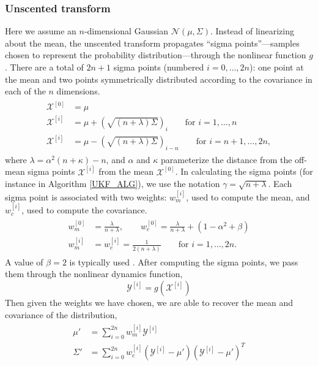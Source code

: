 \documentclass[twoside]{article}
\begin{document}
\subsubsection{Unscented transform}
Here we assume an $n$-dimensional Gaussian $\mathcal{N}(\mu,\Sigma)$. Instead of linearizing about the mean, the unscented transform propagates ``sigma points''---samples chosen to represent the probability distribution---through the nonlinear function $g$. There are a total of $2n+1$ sigma points (numbered $i = 0, \dots, 2n$): one point at the mean and two points symmetrically  distributed according to the covariance in each of the $n$ dimensions.
\begin{align}
\begin{split}
\mathcal{X}^{[0]} &= \mu \\
\mathcal{X}^{[i]} &= \mu + \left(\sqrt{(n+ \lambda)\Sigma}\right)_i \qquad \text{for $i = 1, \dots, n$} \\
\mathcal{X}^{[i]} &= \mu - \left(\sqrt{(n+ \lambda)\Sigma}\right)_{i-n} \qquad \text{for $i = n+1, \dots, 2n$},
\end{split}
\label{UKFsigpts}
\end{align}
where $\lambda = \alpha^2(n+\kappa) - n$, and $\alpha$ and $\kappa$ parameterize the distance from the off-mean sigma points $\mathcal{X}^{[i]}$ from the mean $\mathcal{X}^{[0]}$. In calculating the sigma points (for instance in Algorithm \ref{UKF_ALG}), we use the notation $\gamma = \sqrt{n + \lambda}$.
Each sigma point is associated with two weights: $w_m^{[i]}$, used to compute the mean, and $w_c^{[i]}$, used to compute the covariance.
\begin{align}
\begin{split}
w_m^{[0]} &= \frac{\lambda}{n + \lambda}, \qquad w_c^{[0]} = \frac{\lambda}{n + \lambda} + (1 - \alpha^2 + \beta) \\
w_m^{[i]} &= w_c^{[i]} = \frac{1}{2(n+\lambda)} \qquad \text{for $i = 1, \dots, 2n$}.
\end{split}
\label{UKFweights}
\end{align}
A value of $\beta = 2$ is typically used \cite{thrun2005probabilistic}.
After computing the sigma points, we pass them through the nonlinear dynamics function,
\begin{equation}
	 \mathcal{Y}^{[i]} = g( \mathcal{X}^{[i]})
\end{equation}
Then given the weights we have chosen, we are able to recover the mean and covariance of the distribution,
\begin{align}
\begin{split}
\mu' &= \sum_{i=0}^{2n} w_m^{[i]}\mathcal{Y}^{[i]}\\
\Sigma' &= \sum_{i=0}^{2n} w_c^{[i]}(\mathcal{Y}^{[i]}-\mu')(\mathcal{Y}^{[i]}-\mu')^{T}
\end{split}
\end{align}
\end{document}
